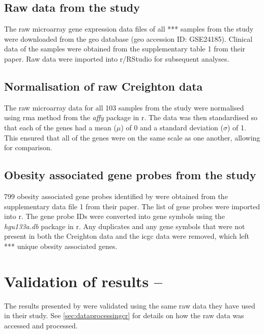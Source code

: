 \subsection{Raw data from the \citet{Creighton2012} study}
\label{subsec:rawdatacr}

The raw microarray gene expression data files of all *** samples from the \citet{Creighton2012} study were downloaded from the \gls{geo} database (\gls{geo} accession ID: GSE24185).
Clinical data of the samples were obtained from the supplementary table 1 from their paper.
Raw data were imported into \gls{r}/RStudio for subsequent analyses.



\subsection{Normalisation of raw Creighton data}
\label{subsec:normcrdata}

The raw microarray data for all 103 samples from the study were normalised using \gls{rma} method from the \textit{affy} package in \gls{r}.
The data was then standardised so that each of the genes had a mean ($\mu$) of 0 and a standard deviation ($\sigma$) of 1.
This ensured that all of the genes were on the same scale as one another, allowing for comparison.

\subsection{Obesity associated gene probes from the \citet{Creighton2012} study}
\label{subsec:crobsgene}

799 obesity associated gene probes identified by \citet{Creighton2012} were obtained from the supplementary data file 1 from their paper.
The list of gene probes were imported into \gls{r}.
The gene probe IDs were converted into gene symbols using the \textit{hgu133a.db} package in \gls{r}.
Any duplicates and any gene symbols that were not present in both the Creighton data and the \gls{icgc} data were removed, which left *** unique obesity associated genes.

\section{Validation of results -- \citet{Creighton2012}}
\label{sec:valresultscr}

The results presented by \citet{Creighton2012} were validated using the same raw data they have used in their study.
See  \cref{sec:dataprocessingcr} for details on how the raw data was accessed and processed.


